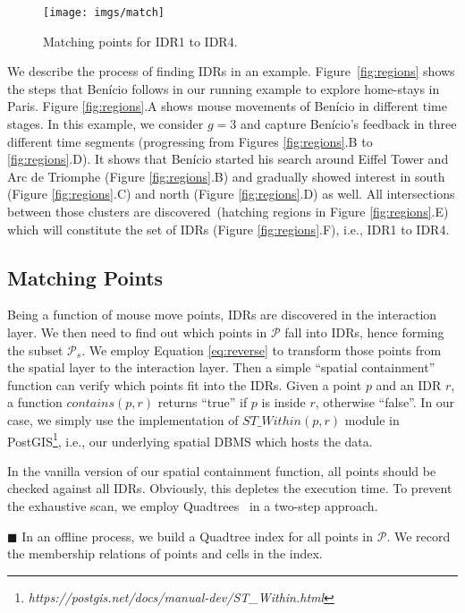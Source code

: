 \documentclass[sigconf,edbt]{acmart-edbt2019}
\begin{document}
\begin{figure}[t]
\centering
   \texttt{[image: imgs/match]}
  \caption{Matching points for IDR1 to IDR4.}
  \label{fig:match}
\end{figure}

\vspace{2pt}
We describe the process of finding IDRs in an example. Figure~\ref{fig:regions} shows the steps that Ben\'icio follows in our running example to explore home-stays in Paris. Figure \ref{fig:regions}.A shows mouse movements of Ben\'icio in different time stages. In this example, we consider $g = 3$ and capture Ben\'icio's feedback in three different time segments (progressing from Figures \ref{fig:regions}.B to \ref{fig:regions}.D). It shows that Ben\'icio started his search around Eiffel Tower and Arc de Triomphe (Figure \ref{fig:regions}.B) and gradually showed interest in south (Figure \ref{fig:regions}.C) and north (Figure \ref{fig:regions}.D) as well. All intersections between those clusters are discovered~(hatching regions in Figure \ref{fig:regions}.E) which will constitute the set of IDRs (Figure \ref{fig:regions}.F), i.e., IDR1 to IDR4.

\subsection{Matching Points}
Being a function of mouse move points, IDRs are discovered in the interaction layer. We then need to find out which points in $\mathcal{P}$ fall into IDRs, hence forming the subset $\mathcal{P}_s$. We employ Equation \ref{eq:reverse} to transform those points from the spatial layer to the interaction layer. Then a simple ``spatial containment'' function can verify which points fit into the IDRs. Given a point $p$ and an IDR $r$, a function $\mathit{contains}(p,r)$ returns ``true'' if $p$ is inside $r$, otherwise ``false''. In our case, we simply use the implementation of $\mathit{ST\_Within}(p,r)$ module in PostGIS\footnote{\it https://postgis.net/docs/manual-dev/ST\_Within.html}, i.e., our underlying spatial DBMS which hosts the data.

\vspace{2pt}
In the vanilla version of our spatial containment function, all points should be checked against all IDRs. Obviously, this depletes the execution time. To prevent the exhaustive scan, we employ Quadtrees~\cite{finkel1974quad} in a two-step approach.

\vspace{4pt}
\noindent $\blacksquare$ In an offline process, we build a Quadtree index for all points in $\mathcal{P}$. We record the membership relations of points and cells in the index.
\end{document}
